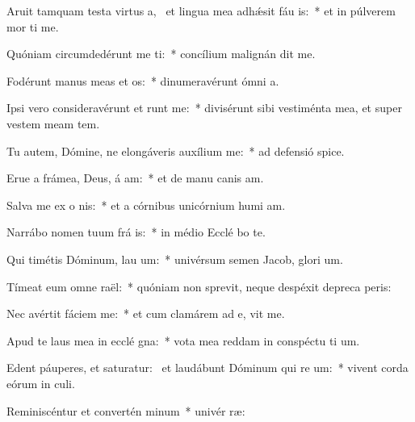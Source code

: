 \item Aruit tamquam testa virtus a,~\pscross{} et lingua mea adhǽsit fáu is:~* et in púlverem mor ti me.
\item Quóniam circumdedérunt me  ti:~* concílium malignán dit me.
\item Fodérunt manus meas et  os:~* dinumeravérunt ómni  a.
\item Ipsi vero consideravérunt et runt me:~* divisérunt sibi vestiménta mea, et super vestem meam  tem.
\item Tu autem, Dómine, ne elongáveris auxílium   me:~* ad defensió  spice.
\item Erue a frámea, Deus, á am:~* et de manu canis  am.
\item Salva me ex o nis:~* et a córnibus unicórnium humi am.
\item Narrábo nomen tuum frá is:~* in médio Ecclé bo te.
\item Qui timétis Dóminum, lau um:~* univérsum semen Jacob, glori um.
\item Tímeat eum omne  raël:~* quóniam non sprevit, neque despéxit depreca peris:
\item Nec avértit fáciem   me:~* et cum clamárem ad e, vit me.
\item Apud te laus mea in ecclé gna:~* vota mea reddam in conspéctu ti um.
\item Edent páuperes, et saturatur:~\pscross{} et laudábunt Dóminum qui re um:~* vivent corda eórum in  culi.
\item Reminiscéntur et convertén  minum~* univér  ræ:
